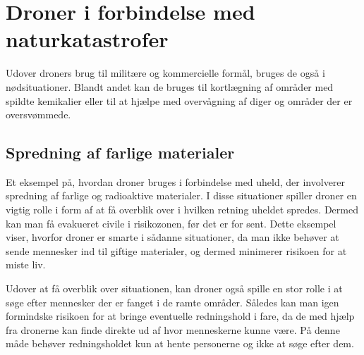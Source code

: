 
\section{Droner i forbindelse med naturkatastrofer}\label{sc:dronerkatastrofe}

Udover droners brug til militære og kommercielle formål, bruges de også i nødsituationer. Blandt andet kan de bruges til kortlægning af områder med spildte kemikalier eller til at hjælpe med overvågning af diger og områder der er oversvømmede. 

\subsection{Spredning af farlige materialer}
Et eksempel på, hvordan droner bruges i forbindelse med uheld, der involverer spredning af farlige og radioaktive materialer. I disse situationer spiller droner en vigtig rolle i form af at få overblik over i hvilken retning uheldet spredes. Dermed kan man få evakueret civile i risikozonen, før det er for sent. Dette eksempel viser, hvorfor droner er smarte i sådanne situationer, da man ikke behøver at sende mennesker ind til giftige materialer, og dermed minimerer risikoen for at miste liv.
\par
Udover at få overblik over situationen, kan droner også spille en stor rolle i at søge efter mennesker der er fanget i de ramte områder. Således kan man igen formindske risikoen for at bringe eventuelle redningshold i fare, da de med hjælp fra dronerne kan finde direkte ud af hvor menneskerne kunne være. På denne måde behøver redningsholdet kun at hente personerne og ikke at søge efter dem. 

